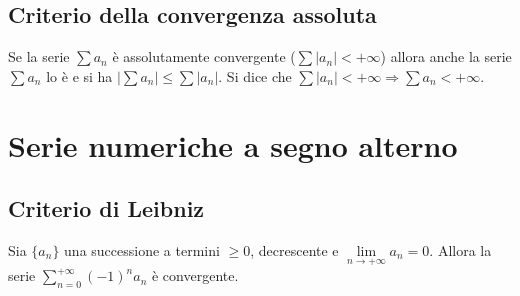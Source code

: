 \subsection{Criterio della convergenza assoluta}
Se la serie $\sum a_n$ \`e assolutamente convergente ($\sum |a_n|<+\infty$) allora anche la serie $\sum a_n$ lo \`e e si ha $|\sum a_n|\le \sum |a_n|$. Si dice che $\sum |a_n|<+
\infty\Rightarrow\sum a_n<+\infty$.
\section{Serie numeriche a segno alterno}
\subsection{Criterio di Leibniz}
Sia $\{a_n\}$ una successione a termini $\ge0$, decrescente e $\lim\limits_{n\rightarrow+\infty}a_n=0$. Allora la serie $\sum\limits_{n=0}^{+\infty}(-1)^na_n$ \`e convergente.